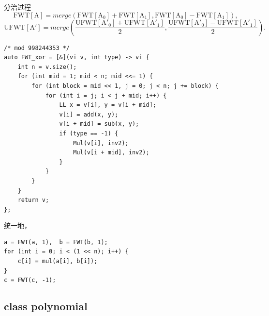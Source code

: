 \documentclass[UTF8, a4paper, titlepage, twoside]{ctexart}
\begin{document}
分治过程
\[
\operatorname{FWT[A]} = merge(\operatorname{FWT[A_0]} + \operatorname{FWT[A_1]}, \operatorname{FWT[A_0]} - \operatorname{FWT[A_1]}),
\]
\[
\operatorname{UFWT[A']} = merge\left(\frac{\operatorname{UFWT[A'_0]} + \operatorname{UFWT[A'_1]}}{2}, \frac{\operatorname{UFWT[A'_0]} - \operatorname{UFWT[A'_1]}}{2}\right).
\]

\begin{lstlisting}[style=cpp]
/* mod 998244353 */
auto FWT_xor = [&](vi v, int type) -> vi {
    int n = v.size();
    for (int mid = 1; mid < n; mid <<= 1) {
        for (int block = mid << 1, j = 0; j < n; j += block) {
            for (int i = j; i < j + mid; i++) {
                LL x = v[i], y = v[i + mid];
                v[i] = add(x, y);
                v[i + mid] = sub(x, y);
                if (type == -1) {
                    Mul(v[i], inv2);
                    Mul(v[i + mid], inv2);
                }
            }
        }
    }
    return v;
};
\end{lstlisting}

统一地，
\begin{lstlisting}[style=cpp]
a = FWT(a, 1),  b = FWT(b, 1);
for (int i = 0; i < (1 << n); i++) {
    c[i] = mul(a[i], b[i]);
}
c = FWT(c, -1);
\end{lstlisting}

\subsection{ class polynomial }
\end{document}
